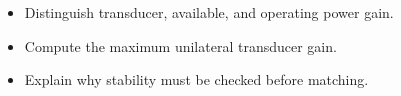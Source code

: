 \begin{objectives}
\begin{itemize}[leftmargin=1.4em,itemsep=2pt]
\item Distinguish transducer, available, and operating power gain.
\item Compute the maximum unilateral transducer gain.
\item Explain why stability must be checked before matching.
\end{itemize}
\end{objectives}
